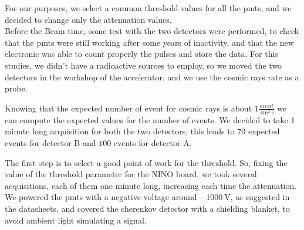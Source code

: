 \begin{figure}[hbtp]
\centering
{}
\end{figure}

For our purposes, we select a common threshold values for all the pmts, and we decided to change only the attenuation values.\\
Before the Beam time, some test with the two detectors were performed, to check that the pmts were still working after some years of inactivity, and that the new electronic was able to count properly the pulses and store the data. For this studies, we didn't have a radioactive sources to employ, so we moved the two detectors in the workshop of the accelerator, and we use the cosmic rays rate as a probe. 

Knowing that the expected number of event for cosmic rays is about $1 \frac{event}{\SI{}{\centi \meter\squared} \SI{}{\second}}$ we can compute the expected values for the number of events. We decided to take 1 minute long acquisition for both the two detectors, this leads to $70$ expected events for detector B  and  $100$ events for detector A.  \smallskip

The first step is to select a good point of work for the threshold. So, fixing the value of the threshold parameter for the NINO board, we took several acquisitions, each of them one minute long, increasing each time the attenuation. We powered the pmts with a negative voltage around $ \SI{-1000}{\volt}$, as suggested in the datasheets, and covered the cherenkov detector with a shielding blanket, to avoid ambient light simulating a signal.

